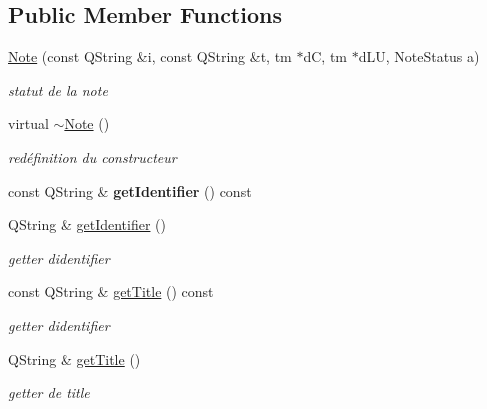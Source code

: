 \subsection*{Public Member Functions}
\begin{DoxyCompactItemize}
\item 
\hyperlink{classNote_a02fb01f74090a4f302882782445ca9ef}{Note} (const Q\+String \&i, const Q\+String \&t, tm $\ast$dC, tm $\ast$d\+LU, Note\+Status a)
\begin{DoxyCompactList}\small\item\em statut de la note \end{DoxyCompactList}\item 
virtual \hyperlink{classNote_a673b00445b14ee36a2471662b83f7c1c}{$\sim$\+Note} ()
\begin{DoxyCompactList}\small\item\em redéfinition du constructeur \end{DoxyCompactList}\item 
\mbox{\label{classNote_a842387aa742b9c81df5681071703497d}} 
const Q\+String \& {\bfseries get\+Identifier} () const
\item 
\mbox{\label{classNote_a486bececfcdb31bdbda140914dea43f3}} 
Q\+String \& \hyperlink{classNote_a486bececfcdb31bdbda140914dea43f3}{get\+Identifier} ()
\begin{DoxyCompactList}\small\item\em getter d\textquotesingle{}identifier \end{DoxyCompactList}\item 
\mbox{\label{classNote_a4d09b0e195203cdbc9464a0080de99c5}} 
const Q\+String \& \hyperlink{classNote_a4d09b0e195203cdbc9464a0080de99c5}{get\+Title} () const
\begin{DoxyCompactList}\small\item\em getter d\textquotesingle{}identifier \end{DoxyCompactList}\item 
\mbox{\label{classNote_aef7f23af8457fede2bc63f91f32d4d0c}} 
Q\+String \& \hyperlink{classNote_aef7f23af8457fede2bc63f91f32d4d0c}{get\+Title} ()
\begin{DoxyCompactList}\small\item\em getter de title \end{DoxyCompactList}\item 

\end{DoxyCompactItemize}
